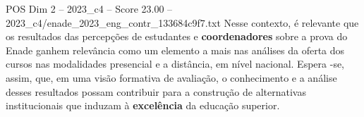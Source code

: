 \begin{textsample}{POS Dim 2 – 2023\_c4 – Score 23.00 – 2023\_c4/enade\_2023\_eng\_contr\_133684c9f7.txt}
Nesse contexto, é relevante que os resultados das percepções de estudantes e \textbf{coordenadores} sobre a prova do Enade ganhem relevância como um elemento a mais nas análises da oferta dos cursos nas modalidades presencial e a distância, em nível nacional.
Espera -se, assim, que, em uma visão formativa de avaliação, o conhecimento e a análise desses resultados possam contribuir para a construção de alternativas institucionais que induzam à \textbf{excelência} da educação superior.

\end{textsample}
